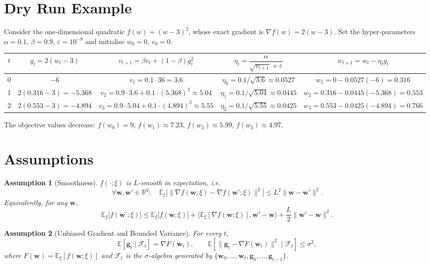 \documentclass{article}
\newtheorem{assumption}{Assumption}
\newcommand{\E}{\mathbb{E}}
\newcommand{\R}{\mathbb{R}}
\begin{document}
\section*{Dry Run Example}
Consider the one‑dimensional quadratic $f(w)=(w-3)^{2}$, whose exact gradient is $\nabla f(w)=2(w-3)$.  
Set the hyper‑parameters $\alpha=0.1$, $\beta=0.9$, $\varepsilon=10^{-8}$ and initialise $w_{0}=0$, $v_{0}=0$.

\begin{center}
\begin{tabular}{c|c|c|c|c}
$t$ & $g_{t}=2(w_{t}-3)$ & $v_{t+1}= \beta v_{t}+(1-\beta)g_{t}^{2}$ & $\eta_{t}= \dfrac{\alpha}{\sqrt{v_{t+1}}+\varepsilon}$ & $w_{t+1}=w_{t}-\eta_{t}g_{t}$\\ \hline
0 & $-6$ & $v_{1}=0.1\cdot36=3.6$ & $\eta_{0}=0.1/\sqrt{3.6}\approx 0.0527$ & $w_{1}=0-0.0527(-6)=0.316$\\[4pt]
1 & $2(0.316-3)=-5.368$ & $v_{2}=0.9\cdot3.6+0.1\cdot(5.368)^{2}\approx 5.04$ & $\eta_{1}=0.1/\sqrt{5.04}\approx 0.0445$ & $w_{2}=0.316-0.0445(-5.368)=0.553$\\[4pt]
2 & $2(0.553-3)=-4.894$ & $v_{3}=0.9\cdot5.04+0.1\cdot(4.894)^{2}\approx 5.55$ & $\eta_{2}=0.1/\sqrt{5.55}\approx 0.0425$ & $w_{3}=0.553-0.0425(-4.894)=0.766$
\end{tabular}
\end{center}
The objective values decrease: $f(w_{0})=9$, $f(w_{1})\approx 7.23$, $f(w_{2})\approx 5.99$, $f(w_{3})\approx 4.97$.

\newpage
\section*{Assumptions}
\begin{assumption}[Smoothness]\label{as:smooth}
$f(\cdot;\xi)$ is $L$‑smooth in expectation, i.e.
\[
\forall \mathbf w,\mathbf w'\in\R^{d}:\quad 
\E_{\xi}\!\big[\|\nabla f(\mathbf w;\xi)-\nabla f(\mathbf w';\xi)\|^{2}\big]\le L^{2}\|\mathbf w-\mathbf w'\|^{2}.
\]
Equivalently, for any $\mathbf w$,
\[
\E_{\xi}\!\big[f(\mathbf w';\xi)\big]\le\E_{\xi}\!\big[f(\mathbf w;\xi)\big]
+ \langle \E_{\xi}[\nabla f(\mathbf w;\xi)],\mathbf w'-\mathbf w\rangle
+\frac{L}{2}\|\mathbf w'-\mathbf w\|^{2}.
\tag{4}
\]
\end{assumption}

\begin{assumption}[Unbiased Gradient and Bounded Variance]\label{as:unbiased}
For every $t$,
\[
\E[\mathbf g_{t}\mid\mathcal F_{t}]=\nabla F(\mathbf w_{t}),\qquad 
\E[\|\mathbf g_{t}-\nabla F(\mathbf w_{t})\|^{2}\mid\mathcal F_{t}]\le\sigma^{2},
\]
where $F(\mathbf w)=\E_{\xi}[f(\mathbf w;\xi)]$ and $\mathcal F_{t}$ is the $\sigma$‑algebra generated by
$\{\mathbf w_{0},\dots,\mathbf w_{t},\mathbf g_{0},\dots,\mathbf g_{t-1}\}$.
\end{assumption}
\end{document}
